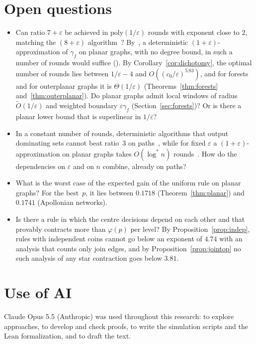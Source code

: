 \documentclass[11pt]{article}
\theoremstyle{remark}
\begin{document}
\section{Open questions}\label{sec:open}
\begin{itemize}
\item Can ratio $7+\varepsilon$ be achieved in $\mathrm{poly}(1/\varepsilon)$ rounds with exponent
  close to $2$, matching the $(8+\varepsilon)$ algorithm~\cite{W26}? By~\cite{AS26}, a
  deterministic $(1+\varepsilon)$-approximation of $\gamma_f$ on planar graphs, with no degree bound,
  in such a number of rounds would suffice (\cite[Open Problem~3]{AS26}). By Corollary~\ref{cor:dichotomy}, the
  optimal number of rounds lies between $1/\varepsilon-4$ and $O((c_0/\varepsilon)^{5.83})$, and for
  forests and for outerplanar graphs it is $\Theta(1/\varepsilon)$
  (Theorems~\ref{thm:forests} and~\ref{thm:outerplanar}). Do planar graphs admit local
  windows of radius $\tilde O(1/\varepsilon)$ and weighted boundary $\varepsilon\gamma_f$
  (Section~\ref{sec:forests})? Or is there a planar lower bound that is superlinear in
  $1/\varepsilon$?
\item In a constant number of rounds, deterministic algorithms that output dominating sets cannot
  beat ratio~$3$ on paths~\cite[Thm.~8.7]{AS26}, while for fixed $\varepsilon$ a
  $(1+\varepsilon)$-approximation on planar graphs takes $O(\log^*n)$ rounds~\cite{CHW08}. How do
  the dependencies on $\varepsilon$ and on $n$ combine, already on paths?
\item What is the worst case of the expected gain of the uniform rule on planar graphs? For the
  best~$p$, it lies between $0.1718$ (Theorem~\ref{thm:planar}) and $0.1741$ (Apollonian networks).
\item Is there a rule in which the centre decisions depend on each other and that provably contracts
  more than $\varphi(p)$ per level? By Proposition~\ref{prop:indep}, rules with independent coins
  cannot go below an exponent of $4.74$ with an analysis that counts only join edges, and by
  Proposition~\ref{prop:jointop} no such analysis of any star contraction goes below $3.81$.
\end{itemize}

\section*{Use of AI}

Claude Opus 5.5 (Anthropic) was used throughout this research: to explore approaches, to develop
and check proofs, to write the simulation scripts and the Lean formalization, and to draft the
text.
\end{document}
